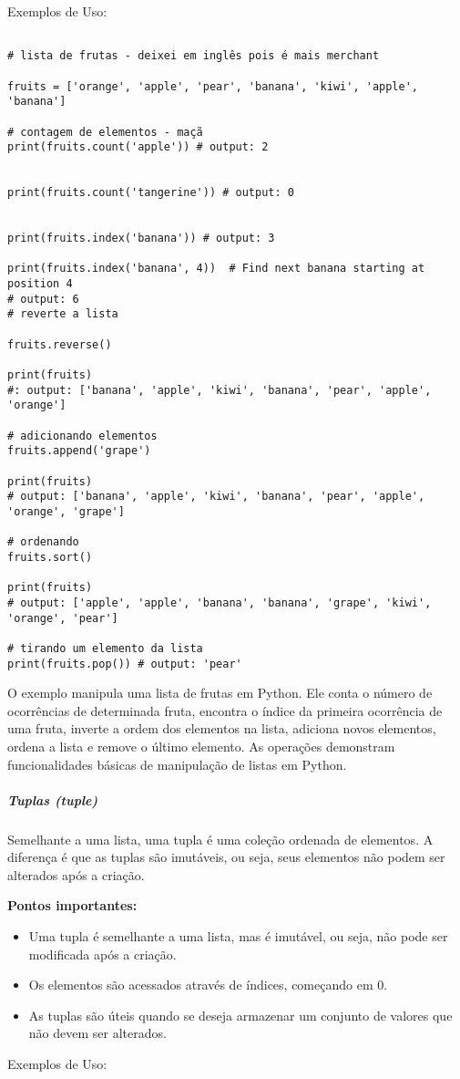 \documentclass[a4paper, 12pt, onecolumn,singlespacing]{article}
\begin{document}
	Exemplos de Uso:
	
	\begin{verbatim}
		
# lista de frutas - deixei em inglês pois é mais merchant

fruits = ['orange', 'apple', 'pear', 'banana', 'kiwi', 'apple', 'banana']

# contagem de elementos - maçã
print(fruits.count('apple')) # output: 2


print(fruits.count('tangerine')) # output: 0


print(fruits.index('banana')) # output: 3

print(fruits.index('banana', 4))  # Find next banana starting at position 4
# output: 6
# reverte a lista

fruits.reverse()

print(fruits) 
#: output: ['banana', 'apple', 'kiwi', 'banana', 'pear', 'apple', 'orange']

# adicionando elementos
fruits.append('grape')

print(fruits) 
# output: ['banana', 'apple', 'kiwi', 'banana', 'pear', 'apple', 'orange', 'grape']

# ordenando
fruits.sort()

print(fruits) 
# output: ['apple', 'apple', 'banana', 'banana', 'grape', 'kiwi', 'orange', 'pear']

# tirando um elemento da lista
print(fruits.pop()) # output: 'pear'

	\end{verbatim}

O exemplo manipula uma lista de frutas em Python. Ele conta o número de ocorrências de determinada fruta, encontra o índice da primeira ocorrência de uma fruta, inverte a ordem dos elementos na lista, adiciona novos elementos, ordena a lista e remove o último elemento. As operações demonstram funcionalidades básicas de manipulação de listas em Python.

	\subparagraph{Tuplas (\textit{tuple})} 
	\label{python_estrutura_tuplas}
	Semelhante a uma lista, uma tupla é uma coleção ordenada de elementos. A diferença é que as tuplas são imutáveis, ou seja, seus elementos não podem ser alterados após a criação.
	
	\textbf{Pontos importantes:}
	\begin{itemize}
		\item Uma tupla é semelhante a uma lista, mas é imutável, ou seja, não pode ser modificada após a criação.
		\item Os elementos são acessados através de índices, começando em 0.
		\item As tuplas são úteis quando se deseja armazenar um conjunto de valores que não devem ser alterados.
	\end{itemize}
		Exemplos de Uso:
	
\end{document}

